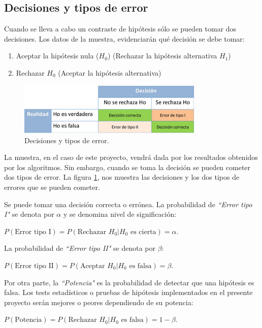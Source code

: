\subsection{Decisiones y tipos de error}
Cuando se lleva a cabo un contraste de hipótesis sólo se pueden tomar dos decisiones. Los datos de la muestra,
evidenciarán qué decisión se debe tomar:
\begin{enumerate}
\item Aceptar la hipótesis nula ($H_0$) (Rechazar la hipótesis alternativa $H_1$)
\item Rechazar $H_0$ (Aceptar la hipótesis alternativa)
\end{enumerate}
\begin{figure}[h]
\centering
\includegraphics[height=2.5cm]{figuras/figura1.png}
\caption{Decisiones y tipos de error.}
\label{fig:decision}
\end{figure}
La muestra, en el caso de este proyecto, vendrá dada por los resultados obtenidos por los algoritmos. Sin embargo,
cuando se toma la decisión se pueden cometer dos tipos de error. La figura \ref{fig:decision}, nos muestra las
decisiones y los dos tipos de errores que se pueden cometer.

Se puede tomar una decisión correcta o errónea. La probabilidad de \textit{``Error tipo I"} se denota por $\alpha$
y se denomina nivel de significación:
\begin{center}
$P(\mbox{Error tipo I}) = P(\mbox{Rechazar } H_0|H_0 \mbox{ es cierta}) =\alpha.$
\end{center}
La probabilidad de \textit{``Error tipo II"} se denota por $\beta$:
\begin{center}
$P(\mbox{Error tipo II}) = P(\mbox{Aceptar } H_0|H_0 \mbox{ es falsa}) =\beta.$
\end{center}
Por otra parte, la \textit{``Potencia"} es la probabilidad de detectar que una hipótesis es falsa. Los tests
estadísticos o pruebas de hipótesis implementados en el presente proyecto serán mejores o peores dependiendo
de su potencia:
\begin{center}
$P(\mbox{Potencia}) = P(\mbox{Rechazar } H_0|H_0 \mbox{ es falsa}) =1-\beta.$
\end{center}

